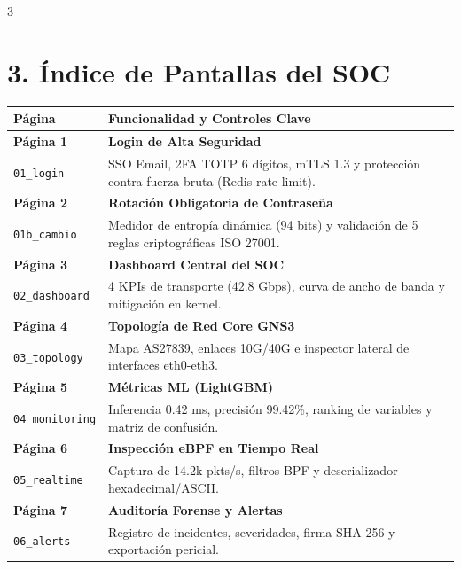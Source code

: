 \documentclass[11pt]{article}
\begin{document}
\begin{multicols}{3}
\columnbreak

\section*{\color{primary}\Large 3. Índice de Pantallas del SOC}

\color{textsecondary}
\begin{tabularx}{\linewidth}{lX}
\toprule
\textbf{\color{primary}Página} & \textbf{\color{primary}Funcionalidad y Controles Clave} \\
\midrule
\textbf{\color{textprimary}Página 1} & \textbf{\color{textprimary}Login de Alta Seguridad}\\[-1bp]
\texttt{01\_login} & SSO Email, 2FA TOTP 6 dígitos, mTLS 1.3 y protección contra fuerza bruta (Redis rate-limit). \\
\midrule
\textbf{\color{textprimary}Página 2} & \textbf{\color{textprimary}Rotación Obligatoria de Contraseña}\\[-1bp]
\texttt{01b\_cambio} & Medidor de entropía dinámica (94 bits) y validación de 5 reglas criptográficas ISO 27001. \\
\midrule
\textbf{\color{textprimary}Página 3} & \textbf{\color{textprimary}Dashboard Central del SOC}\\[-1bp]
\texttt{02\_dashboard} & 4 KPIs de transporte (42.8 Gbps), curva de ancho de banda y mitigación en kernel. \\
\midrule
\textbf{\color{textprimary}Página 4} & \textbf{\color{textprimary}Topología de Red Core GNS3}\\[-1bp]
\texttt{03\_topology} & Mapa AS27839, enlaces 10G/40G e inspector lateral de interfaces eth0-eth3. \\
\midrule
\textbf{\color{textprimary}Página 5} & \textbf{\color{textprimary}Métricas ML (LightGBM)}\\[-1bp]
\texttt{04\_monitoring} & Inferencia 0.42 ms, precisión 99.42\%, ranking de variables y matriz de confusión. \\
\midrule
\textbf{\color{textprimary}Página 6} & \textbf{\color{textprimary}Inspección eBPF en Tiempo Real}\\[-1bp]
\texttt{05\_realtime} & Captura de 14.2k pkts/s, filtros BPF y deserializador hexadecimal/ASCII. \\
\midrule
\textbf{\color{textprimary}Página 7} & \textbf{\color{textprimary}Auditoría Forense y Alertas}\\[-1bp]
\texttt{06\_alerts} & Registro de incidentes, severidades, firma SHA-256 y exportación pericial. \\

\end{tabularx}
\end{multicols}
\end{document}
